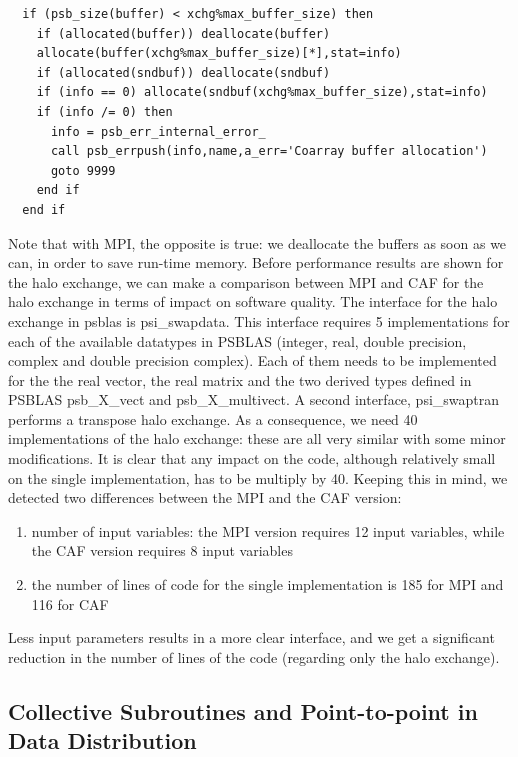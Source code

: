 \documentclass{IOS-Book-Article}
\begin{document}
\lstset{language=Fortran} 
\begin{lstlisting}
  if (psb_size(buffer) < xchg%max_buffer_size) then
    if (allocated(buffer)) deallocate(buffer)
    allocate(buffer(xchg%max_buffer_size)[*],stat=info)
    if (allocated(sndbuf)) deallocate(sndbuf)
    if (info == 0) allocate(sndbuf(xchg%max_buffer_size),stat=info)
    if (info /= 0) then
      info = psb_err_internal_error_
      call psb_errpush(info,name,a_err='Coarray buffer allocation')
      goto 9999
    end if
  end if
\end{lstlisting}

Note that with MPI, the opposite is true: we deallocate the buffers as soon as we can, in order to save run-time memory.
Before performance results are shown for the halo exchange, we can make a comparison between MPI and CAF for the halo exchange in terms of impact on software quality.
The interface for the halo exchange in psblas is psi\_swapdata. This interface requires 5 implementations for each of the available datatypes in PSBLAS (integer, real, double precision, complex and double precision complex). Each of them needs to be implemented for the the real vector, the real matrix and the two derived types defined in PSBLAS psb\_X\_vect and psb\_X\_multivect. A second interface, psi\_swaptran performs a transpose halo exchange. As a consequence, we need 40 implementations of the halo exchange: these are all very similar with some minor modifications. It is clear that any impact on the code, although relatively small on the single implementation, has to be multiply by 40. 
Keeping this in mind, we detected two differences between the MPI and the CAF version:

\begin{enumerate}
\item number of input variables: the MPI version requires 12 input variables, while the CAF version requires 8 input variables
\item the number of lines of code for the single implementation is 185 for MPI and 116 for CAF 
\end{enumerate}

Less input parameters results in a more clear interface, and we get a significant reduction in the number of lines of the code (regarding only the halo exchange).
  
\subsection{Collective Subroutines and Point-to-point in Data Distribution}
\end{document}

